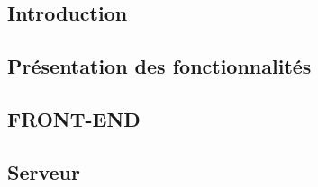 

\subsection{Introduction}


\subsection{Présentation des fonctionnalités}




\subsection{FRONT-END}


\subsection{Serveur}


%

%
